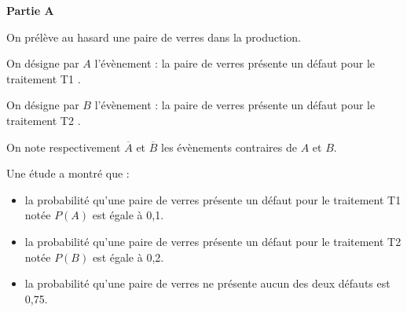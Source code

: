 \documentclass[10pt,a4paper]{article}
\begin{document}
\bigskip

\textbf{Partie A}

\medskip

On prélève au hasard une paire de verres dans la production.

On désigne par $A$ l'évènement : \og la paire de verres présente un défaut pour le traitement T1 \fg.

On désigne par $B$ l'évènement : \og la paire de verres présente un défaut pour le traitement T2 \fg.

On note respectivement $\overline{A}$ et $\overline{B}$ les évènements contraires de $A$ et $B$.

Une étude a montré que :

\begin{itemize}
\item la probabilité qu'une paire de verres présente un défaut pour le traitement T1 notée $P(A)$ est égale à 0,1.
\item la probabilité qu'une paire de verres présente un défaut pour le traitement T2 notée $P(B)$ est égale à 0,2.
\item la probabilité qu'une paire de verres ne présente aucun des deux défauts est 0,75.
\end{itemize}

\medskip
\end{document}
